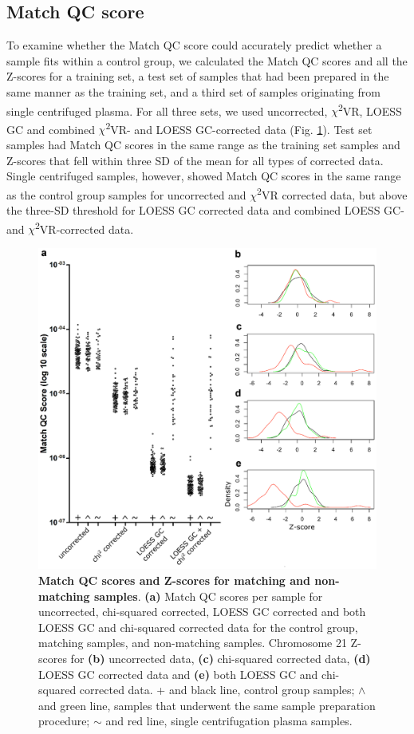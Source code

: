 \subsection{Match QC score}
To examine whether the Match QC score could accurately predict whether a sample fits within a control group, we calculated the Match QC scores and all the Z-scores for a training set, a test set of samples that had been prepared in the same manner as the training set, and a third set of samples originating from single centrifuged plasma. 
For all three sets, we used uncorrected, $\chi$\textsuperscript{2}VR, LOESS GC and combined $\chi$\textsuperscript{2}VR- and LOESS GC-corrected data (Fig. \ref{fig:Algorithms_NIPT_Fig7}). 
Test set samples had Match QC scores in the same range as the training set samples and Z-scores that fell within three SD of the mean for all types of corrected data. 
Single centrifuged samples, however, showed Match QC scores in the same range as the control group samples for uncorrected and $\chi$\textsuperscript{2}VR corrected data, but above the three-SD threshold for LOESS GC corrected data and combined LOESS GC- and $\chi$\textsuperscript{2}VR-corrected data.

\begin{figure}
	\includegraphics[width=0.8\linewidth]{img/Algorithms_NIPT_Fig7}
	\caption[Match QC scores and Z-scores]{\textbf{Match QC scores and Z-scores for matching and non-matching samples}. \textbf{(a)} Match QC scores per sample for uncorrected, chi-squared corrected, LOESS GC corrected and both LOESS GC and chi-squared corrected data for the control group, matching samples, and non-matching samples. Chromosome 21 Z-scores for \textbf{(b)} uncorrected data, \textbf{(c)} chi-squared corrected data, \textbf{(d)} LOESS GC corrected data and \textbf{(e)} both LOESS GC and chi-squared corrected data. + and black line, control group samples; $\wedge$ and green line, samples that underwent the same sample preparation procedure; $\sim$ and red line, single centrifugation plasma samples.}
	\label{fig:Algorithms_NIPT_Fig7}
\end{figure}

